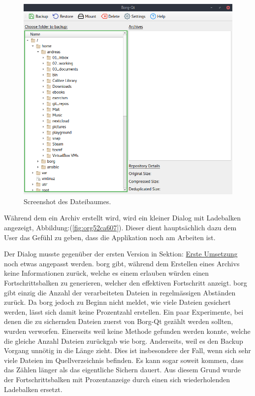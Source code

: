 \begin{figure}[htbp]
\centering
\includegraphics[width=.9\linewidth]{pictures/borgqt_file_tree.png}
\caption{\label{fig:org6491a3c}
Screenshot des Dateibaumes.}
\end{figure}

Während dem ein Archiv erstellt wird, wird ein kleiner Dialog mit Ladebalken
angezeigt, Abbildung:(\ref{fig:org52ca607}). Dieser dient hauptsächlich dazu
dem User das Gefühl zu geben, dass die Applikation noch am Arbeiten ist.

Der Dialog musste gegenüber der ersten Version in Sektion: \hyperref[sec:org040cd93]{Erste Umsetzung} noch
etwas angepasst werden. \gls{borg} gibt, während dem Erstellen eines Archivs
keine Informationen zurück, welche es einem erlauben würden einen
Fortschrittsbalken zu generieren, welcher den effektiven Fortschritt anzeigt.
\gls{borg} gibt einzig die Anzahl der verarbeiteten Dateien in regelmässigen
Abständen zurück. Da \gls{borg} jedoch zu Beginn nicht meldet, wie viele Dateien
gesichert werden, lässt sich damit keine Prozentzahl erstellen. Ein paar
Experimente, bei denen die zu sichernden Dateien zuerst von Borg-Qt gezählt
werden sollten, wurden verworfen. Einerseits weil keine Methode gefunden werden
konnte, welche die gleiche Anzahl Dateien zurückgab wie \gls{borg}. Anderseits,
weil es den Backup Vorgang unnötig in die Länge zieht. Dies ist insbesondere
der Fall, wenn sich sehr viele Dateien im Quellverzeichnis befinden. Es kann
sogar soweit kommen, dass das Zählen länger als das eigentliche Sichern dauert.
Aus diesem Grund wurde der Fortschrittsbalken mit Prozentanzeige durch einen
sich wiederholenden Ladebalken ersetzt.

